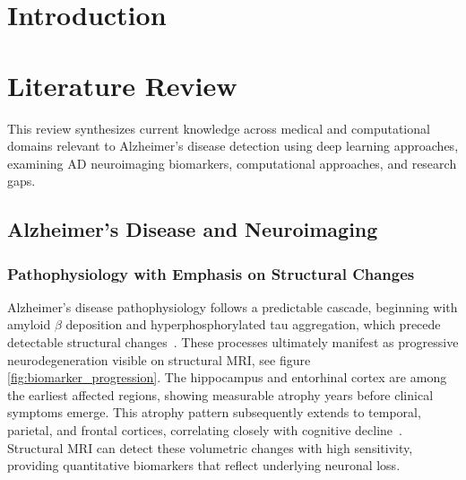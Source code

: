 \documentclass[12pt, a4paper]{article}
\begin{document}
\section{Introduction}


\section{Literature Review}

This review synthesizes current knowledge across medical and computational domains relevant to Alzheimer's disease detection using deep learning approaches, examining AD neuroimaging biomarkers, computational approaches, and research gaps.

\subsection{Alzheimer's Disease and Neuroimaging}

\subsubsection{Pathophysiology with Emphasis on Structural Changes}

Alzheimer's disease pathophysiology follows a predictable cascade, beginning with amyloid $\beta$ deposition and hyperphosphorylated tau aggregation, which precede detectable structural changes~\cite{jack2013tracking}. These processes ultimately manifest as progressive neurodegeneration visible on structural MRI, see figure \ref{fig:biomarker_progression}. The hippocampus and entorhinal cortex are among the earliest affected regions, showing measurable atrophy years before clinical symptoms emerge. This atrophy pattern subsequently extends to temporal, parietal, and frontal cortices, correlating closely with cognitive decline~\cite{vemuri2010role}. Structural MRI can detect these volumetric changes with high sensitivity, providing quantitative biomarkers that reflect underlying neuronal loss.
\end{document}
